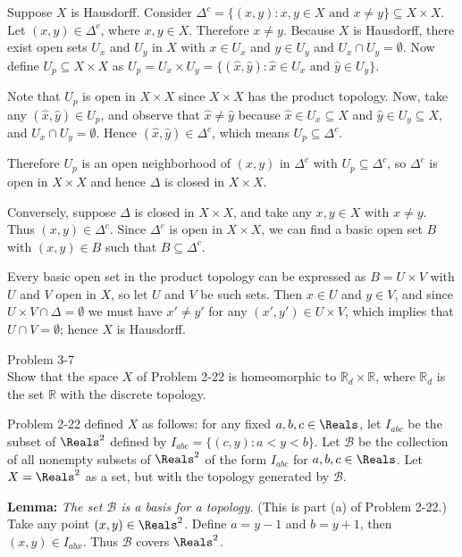 \documentclass{homework651}
\newcommand\nextprob{\newpage}
\begin{document}
\begin{aproblems}
\solution
Suppose $X$ is Hausdorff.  Consider
$\Delta^c=\{(x,y):x,y\in X \text{ and } x\ne y\}\subseteq X\times X$.
Let $(x,y)\in\Delta^c$, where $x,y\in X$.  Therefore $x\ne y$.
Because $X$ is Hausdorff, there exist open sets $U_x$ and $U_y$ in $X$
with $x\in U_x$ and $y\in U_y$ and $U_x\cap U_y=\emptyset$.  Now define
$U_p\subseteq X\times X$ as
$U_p=U_x\times U_y=\{(\hat x,\hat y):\hat x\in U_x\text{ and }
\hat y\in U_y\}$.

Note that $U_p$ is open in $X\times X$
since $X\times X$ has the product topology.
Now, take any $(\hat x,\hat y)\in U_p$,
and observe that $\hat x\ne\hat y$
because $\hat x\in U_x\subseteq X$ and $\hat y\in U_y\subseteq X$,
and $U_x\cap U_y=\emptyset$.
Hence $(\hat x,\hat y)\in\Delta^c$, which means $U_p\subseteq\Delta^c$.

Therefore $U_p$ is an open neighborhood of $(x,y)$ in $\Delta^c$ with
$U_p\subseteq\Delta^c$, so $\Delta^c$ is open in $X\times X$
and hence $\Delta$ is closed in $X\times X$.

Conversely, suppose $\Delta$ is closed in $X\times X$, and take any $x,y\in X$
with $x\ne y$.  Thus $(x,y)\in\Delta^c$. Since $\Delta^c$ is open in
$X\times X$, we can find a basic open set $B$ with $(x,y)\in B$
such that $B\subseteq\Delta^c$.

Every basic open set in the product topology can be expressed as
$B=U\times V$ with $U$ and $V$ open in $X$,
so let $U$ and $V$ be
such sets. Then $x\in U$ and $y\in V$, and since
$U\times V\cap\Delta=\emptyset$ we must have $x'\ne y'$ for
any $(x',y')\in U\times V$, which implies that
$U\cap V=\emptyset$;
hence $X$ is Hausdorff.

\nextprob
\hproblem Problem 3-7\\
Show that the space $X$ of Problem 2-22 is homeomorphic to
$\mathbb{R}_d\times\mathbb{R}$, where $\mathbb{R}_d$ is the set
$\mathbb{R}$ with the discrete topology.

Problem 2-22 defined $X$ as follows: for any fixed $a,b,c\in\Reals$,
let $I_{abc}$ be the subset of $\Reals^2$ defined by
$I_{abc} = \{(c,y):a<y<b\}$.  Let $\mathcal{B}$ be the collection of
all nonempty subsets of $\Reals^2$ of the form $I_{abc}$ for
$a,b,c\in\Reals$.  Let $X=\Reals^2$ as a set, but with the topology
generated by $\mathcal{B}$.

\textbf{Lemma:} \textit{The set $\mathcal{B}$ is a basis for a topology.}
(This is part (a) of Problem 2-22.)\\
Take any point $(x,y)\in\Reals^2$.  Define $a=y-1$ and $b=y+1$, then
$(x,y)\in I_{abx}$.  Thus $\mathcal{B}$ covers $\Reals^2$.


\end{aproblems}
\end{document}
